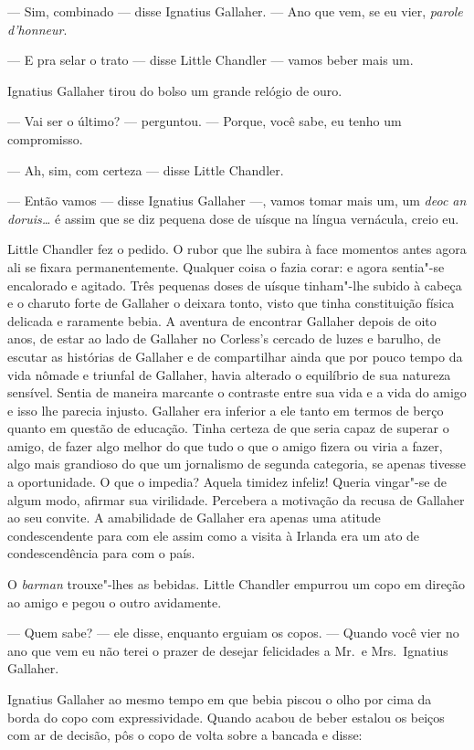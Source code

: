 --- Sim, combinado --- disse Ignatius Gallaher.  --- Ano que vem, se eu vier,
\textit{parole d’honneur}.

--- E pra selar o trato --- disse Little Chandler --- vamos beber mais um.

Ignatius Gallaher tirou do bolso um grande relógio de ouro.

--- Vai ser o último? --- perguntou.  --- Porque, você sabe, eu tenho um
compromisso.

--- Ah, sim, com certeza --- disse Little Chandler.

--- Então vamos --- disse Ignatius Gallaher ---, vamos tomar mais um, um
\textit{deoc an doruis\ldots{}} é assim que se diz pequena dose de uísque na
língua vernácula, creio eu.

Little Chandler fez o pedido.  O rubor que lhe subira à face momentos antes
agora ali se fixara permanentemente.  Qualquer coisa o fazia corar: e agora
sentia"-se encalorado e agitado.  Três pequenas doses de uísque tinham"-lhe
subido à cabeça e o charuto forte de Gallaher o deixara tonto, visto que tinha
constituição física delicada e raramente bebia.  A aventura de encontrar
Gallaher depois de oito anos, de estar ao lado de Gallaher no Corless’s cercado
de luzes e barulho, de escutar as histórias de Gallaher e de compartilhar ainda
que por pouco tempo da vida nômade e triunfal de Gallaher, havia alterado o
equilíbrio de sua natureza sensível.  Sentia de maneira marcante o contraste
entre sua vida e a vida do amigo e isso lhe parecia injusto.  Gallaher era
inferior a ele tanto em termos de berço quanto em questão de educação.  Tinha
certeza de que seria capaz de superar o amigo, de fazer algo melhor do que tudo
o que o amigo fizera ou viria a fazer, algo mais grandioso do que um jornalismo
de segunda categoria, se apenas tivesse a oportunidade.  O que o impedia?
Aquela timidez infeliz!  Queria vingar"-se de algum modo, afirmar sua
virilidade.  Percebera a motivação da recusa de Gallaher ao seu convite.  A
amabilidade de Gallaher era apenas uma atitude condescendente para com ele
assim como a visita à Irlanda era um ato de condescendência para com o país.

O \textit{barman} trouxe"-lhes as bebidas.  Little Chandler empurrou um copo em
direção ao amigo e pegou o outro avidamente.

--- Quem sabe? --- ele disse, enquanto erguiam os copos.  --- Quando você vier
no ano que vem eu não terei o prazer de desejar felicidades a Mr.~e Mrs.~Ignatius Gallaher.

Ignatius Gallaher ao mesmo tempo em que bebia piscou o olho por cima da borda
do copo com expressividade.  Quando acabou de beber estalou os beiços com ar de
decisão, pôs o copo de volta sobre a bancada e disse:

